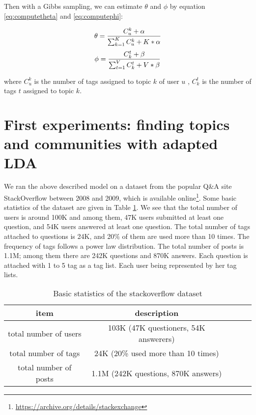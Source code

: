 Then with a Gibbs sampling, we can estimate $\theta$ and $\phi$ by equation \ref{eq:computetheta} and \ref{eq:computephi}:

\begin{equation}\scriptsize
\theta=\frac{ C_u^k + \alpha}{ \sum_{k=1}^K C_u^k+ K* \alpha}
\label{eq:computetheta} 
\end{equation}
\begin{equation}\scriptsize
\phi =\frac{ C_k^t + \beta}{ \sum_{t=1}^V C_k^t+ V* \beta}
\label{eq:computephi} 
\end{equation}

\noindent
where $C_u^k$ is the number of tags assigned to topic $k$ of user $u$ , $C_k^t$ is the number of tags $t$ assigned to topic $k$.


\section{First experiments: finding topics and communities with adapted LDA}

We ran the above described model on a dataset from the popular Q\&A site StackOverflow between 2008 and 2009, which is available online\footnote{\url{https://archive.org/details/stackexchange}}. Some basic statistics of the dataset are given in Table \ref{tab:stackoverflowdata}. We see that the total number of users is around 100K and among them, 47K users submitted at least one question, and 54K users answered at least one question. The total number of tags attached to questions is 24K, and 20\% of them are used more than 10 times. The frequency of tags follows a power law distribution. The total number of posts is 1.1M; among them there are 242K questions and 870K answers. Each question is attached with 1 to 5 tag as a tag list. Each user being represented by her tag lists. 

\begin{table}[htp]
\caption{Basic statistics of the stackoverflow dataset}
\label{tab:stackoverflowdata}
\centering
\begin{tabular}{|c|c|c|c|c|}
\hline
\textbf{item} & \textbf{description} \\
\hline
total number of users & 103K (47K questioners, 54K answerers)\\
\hline
total number of tags & 24K (20\% used more than 10 times)\\
\hline
total number of posts & 1.1M (242K questions, 870K answers) \\
\hline
\end{tabular}
\end{table}


